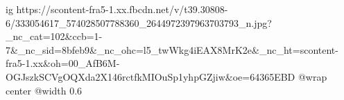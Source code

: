 
 
 
 
 

\ifcmt
  ig https://scontent-fra5-1.xx.fbcdn.net/v/t39.30808-6/333054617_574028507788360_2644972397963703793_n.jpg?_nc_cat=102&ccb=1-7&_nc_sid=8bfeb9&_nc_ohc=l5_twWkg4iEAX8MrK2e&_nc_ht=scontent-fra5-1.xx&oh=00_AfB6M-OGJszkSCVgOQXda2X146rctfkMIOuSp1yhpGZjiw&oe=64365EBD
  @wrap center
  @width 0.6
\fi
